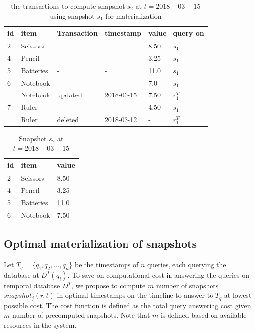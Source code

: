			\begin{center}
			\begin{table}
				\centering
				\caption{the transactions to compute snapshot $s_2$ at $t = 2018-03-15$ using snapshot $s_1$ for materialization}
				\label{table:transactions_materialized}
				\begin{tabular}{p{1cm}p{2cm}p{2cm}p{3cm}p{2cm}p{2cm}}
					\hline
					id & item & Transaction  &timestamp & value  &query on\\ \hline
					2 & Scissors & - & - & 8.50 & $s_1$ \\ \hline
				  	4 & Pencil & - & - & 3.25 & $s_1$ \\ \hline
			  	  	5 & Batteries & - & - & 11.0 & $s_1$ \\ \hline
					6 & Notebook & - & - & 7.0 & $s_1$ \\ 
					  & Notebook & updated & 2018-03-15 & 7.50 & $r_1^T$ \\ \hline
					7 & Ruler & - & - & 4.50 & $s_1$ \\
					  & Ruler & deleted & 2018-03-12 & - & $r_1^T$ \\ \hline
				\end{tabular}
			\end{table}
			\end{center}

			\begin{center}
			\begin{table}
				\centering
				\caption{Snapshot $s_2$ at $t = 2018-03-15$}
				\label{table:snapshot_s2}
				\begin{tabular}{p{4cm}p{4cm}p{4cm}}
					\hline
					id & item  & value  \\ \hline
					2 & Scissors & 8.50   \\ 
					4 & Pencil & 3.25   \\ 
					5 & Batteries & 11.0   \\ 
					6 & Notebook & 7.50 \\ \hline
				\end{tabular}
			\end{table}
			\end{center}

		\subsection{Optimal materialization of snapshots} \label{sec:optimal_materialization}
			Let $T_q = \{q_1, q_2, \dots, q_n\}$ be the timestamps of $n$ queries, each querying the database at $D^T(q_i)$. To save on computational cost in answering the queries on temporal database $D^T$, we propose to compute $m$ number of snapshots $snapshot_j(r,t)$ in optimal timestamps on the timeline to answer to $T_q$ at lowest possible cost. The cost function is defined as the total query answering cost given $m$ number of precomputed snapshots. Note that $m$ is defined based on available resources in the system.

